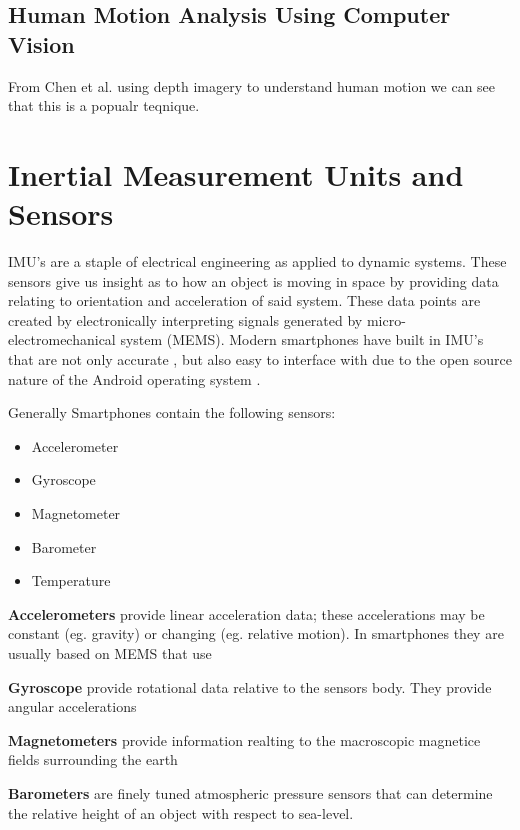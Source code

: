 \subsection{Human Motion Analysis Using Computer Vision}
From Chen et al.\cite{chen2013survey} using depth imagery to understand human motion we can see that this is a popualr teqnique. 














\section{Inertial Measurement Units and Sensors}
IMU's are a staple of electrical engineering as applied to dynamic systems. These sensors give us insight as to how an object is moving in space by providing data relating to orientation and acceleration of said system. These data points are created by electronically interpreting signals generated by micro-electromechanical system (MEMS). Modern smartphones have built in IMU's that are not only accurate \cite{gikas2016rigorous}, but also easy to interface with due to the open source nature of the Android operating system \cite{androidSensorLib}.  

Generally Smartphones contain the following sensors:
\begin{itemize}
\item Accelerometer
\item Gyroscope
\item Magnetometer
\item Barometer
\item Temperature
\end{itemize}

\textbf{Accelerometers} provide linear acceleration data; these accelerations may be constant (eg. gravity) or changing (eg. relative motion). In smartphones they are usually based on MEMS that use  

\textbf{Gyroscope} provide rotational data relative to the sensors body. They provide angular accelerations 

\textbf{Magnetometers} provide information realting to the macroscopic magnetice fields surrounding the earth

\textbf{Barometers} are finely tuned atmospheric pressure sensors that can determine the relative height of an object with respect to sea-level.

